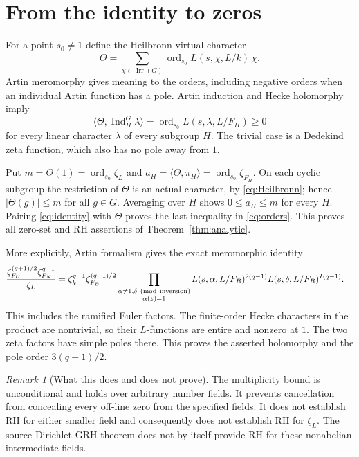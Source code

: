 \documentclass[11pt]{article}
\theoremstyle{remark}\newtheorem{remark}[theorem]{Remark}
\newcommand{\Ind}{\operatorname{Ind}}
\newcommand{\Irr}{\operatorname{Irr}}
\newcommand{\ord}{\operatorname{ord}}
\begin{document}
\section{From the identity to zeros}
For a point $s_0\ne1$ define the Heilbronn virtual character
\[
 \Theta=\sum_{\chi\in\Irr(G)}
       \ord_{s_0}L(s,\chi,L/k)\,\chi.
\]
Artin meromorphy gives meaning to the orders, including negative orders
when an individual Artin function has a pole. Artin induction and Hecke
holomorphy imply
\begin{equation}\label{eq:Heilbronn}
 \langle\Theta,\Ind_H^G\lambda\rangle
 =\ord_{s_0}L(s,\lambda,L/F_H)\ge0
\end{equation}
for every linear character $\lambda$ of every subgroup $H$. The trivial
case is a Dedekind zeta function, which also has no pole away from $1$.

Put $m=\Theta(1)=\ord_{s_0}\zeta_L$ and
$a_H=\langle\Theta,\pi_H\rangle=\ord_{s_0}\zeta_{F_H}$.
On each cyclic subgroup the restriction of $\Theta$ is an actual
character, by \eqref{eq:Heilbronn}; hence $|\Theta(g)|\le m$ for all
$g\in G$. Averaging over $H$ shows $0\le a_H\le m$ for every $H$.
Pairing \eqref{eq:identity} with $\Theta$ proves the last inequality in
\eqref{eq:orders}. This proves all zero-set and RH assertions of
Theorem~\ref{thm:analytic}.

More explicitly, Artin formalism gives the exact meromorphic identity
\begin{align}\label{eq:factorization}
 \frac{\zeta_{F_U}^{(q+1)/2}\zeta_{F_N}^{q-1}}{\zeta_L}
 &=\zeta_k^{q-1}\zeta_{F_B}^{(q-1)/2}
   \prod_{\substack{\alpha\ne1,\delta\ ({\rm mod\ inversion})\\
                    \alpha(z)=1}}
        L(s,\alpha,L/F_B)^{2(q-1)}
   L(s,\delta,L/F_B)^{I(q-1)}.
\end{align}
This includes the ramified Euler factors. The finite-order Hecke
characters in the product are nontrivial, so their $L$-functions are
entire and nonzero at $1$. The two zeta factors have simple poles there.
This proves the asserted holomorphy and the pole order $3(q-1)/2$.

\begin{remark}[What this does and does not prove]
The multiplicity bound is unconditional and holds over arbitrary number
fields. It prevents cancellation from concealing every off-line zero
from the specified fields. It does not establish RH for either smaller
field and consequently does not establish RH for $\zeta_L$. The source
Dirichlet-GRH theorem does not by itself provide RH for these nonabelian
intermediate fields.
\end{remark}
\end{document}
